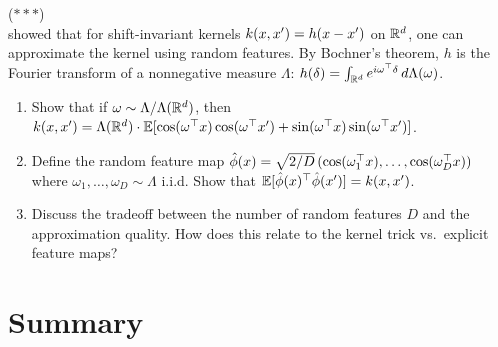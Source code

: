 \documentclass[11pt,a4paper]{article}
\begin{document}
\begin{exercise}
\textnormal{(\(***\))} \\
\citet{rahimi2008} showed that for shift-invariant kernels
$k(x, x') = h(x - x')$ on $\mathbb{R}^d$, one can approximate the
kernel using random features. By Bochner's theorem, $h$ is the
Fourier transform of a nonneg\-ative measure $\Lambda$:
$h(\delta) = \int_{\mathbb{R}^d} e^{i \omega^\top \delta} \, d\Lambda(\omega)$.
\begin{enumerate}[label=(\alph*)]
    \item Show that if $\omega \sim \Lambda / \Lambda(\mathbb{R}^d)$, then
    $k(x, x') = \Lambda(\mathbb{R}^d) \cdot \mathbb{E}[\cos(\omega^\top x)
    \cos(\omega^\top x') + \sin(\omega^\top x) \sin(\omega^\top x')]$.
    \item Define the random feature map $\hat{\phi}(x) =
    \sqrt{2/D} \, (\cos(\omega_1^\top x), \ldots, \cos(\omega_D^\top x))$
    where $\omega_1, \ldots, \omega_D \sim \Lambda$ i.i.d. Show that
    $\mathbb{E}[\hat{\phi}(x)^\top \hat{\phi}(x')] = k(x, x')$.
    \item Discuss the tradeoff between the number of random features
    $D$ and the approximation quality. How does this relate to the
    kernel trick vs.\ explicit feature maps?
\end{enumerate}
\end{exercise}


\section{Summary}
\label{sec:summary}
\end{document}
